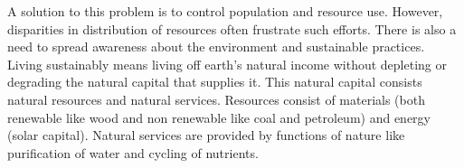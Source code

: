 \documentclass[pdftex,12pt,a4paper]{article}
\begin{document}
A solution to this problem is to control population and resource use. However, disparities in distribution of resources often frustrate such efforts. There is also a need to spread awareness about the environment and sustainable practices. Living sustainably means living off earth's natural income without depleting or degrading the natural capital that supplies it. This natural capital consists natural resources and natural services. Resources consist of materials (both renewable like wood and non renewable like coal and petroleum) and energy (solar capital). Natural services are provided by functions of nature like purification of water and cycling of nutrients.
\end{document}
